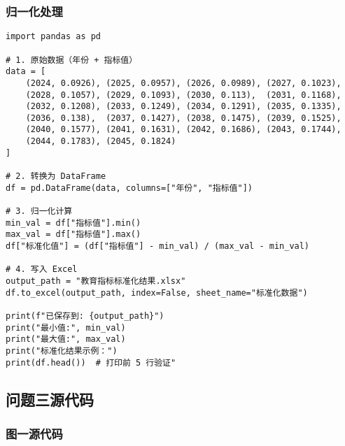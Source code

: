 \documentclass[withoutpreface,bwprint]{cumcmthesis} %
\begin{document}
\subsubsection{归一化处理}

\begin{verbatim}
import pandas as pd

# 1. 原始数据（年份 + 指标值）
data = [
    (2024, 0.0926), (2025, 0.0957), (2026, 0.0989), (2027, 0.1023),
    (2028, 0.1057), (2029, 0.1093), (2030, 0.113),  (2031, 0.1168),
    (2032, 0.1208), (2033, 0.1249), (2034, 0.1291), (2035, 0.1335),
    (2036, 0.138),  (2037, 0.1427), (2038, 0.1475), (2039, 0.1525),
    (2040, 0.1577), (2041, 0.1631), (2042, 0.1686), (2043, 0.1744),
    (2044, 0.1783), (2045, 0.1824)
]

# 2. 转换为 DataFrame
df = pd.DataFrame(data, columns=["年份", "指标值"])

# 3. 归一化计算
min_val = df["指标值"].min()
max_val = df["指标值"].max()
df["标准化值"] = (df["指标值"] - min_val) / (max_val - min_val)

# 4. 写入 Excel
output_path = "教育指标标准化结果.xlsx"
df.to_excel(output_path, index=False, sheet_name="标准化数据")

print(f"已保存到: {output_path}")
print("最小值:", min_val)
print("最大值:", max_val)
print("标准化结果示例：")
print(df.head())  # 打印前 5 行验证"
\end{verbatim}


\subsection{问题三源代码}

\subsubsection{图一源代码}
\end{document}
